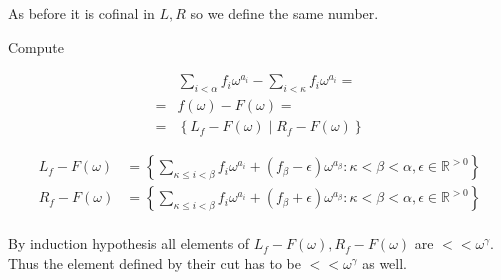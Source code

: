 \documentclass{article}
\newcommand{\curly}[1]{\left\{ #1 \right\}}
\newcommand{\R}{\mathbb{R}}
\newcommand{\w}{\omega}
\begin{document}
As before it is cofinal in $L, R$ so we define the same number.

Compute

\begin{align*}
  &\sum_{i < \alpha} f_i \w^{a_i} - \sum_{i < \kappa} f_i \w^{a_i} = \\
	= &f(\w) - F(\w) = \\
	= &\curly{L_f - F(\w) \mid R_f - F(\w)}
\end{align*}

\begin{align*}
  L_f - F(\w) &= \curly{\sum_{\kappa \leq i < \beta} f_i \w^{a_i} + (f_\beta - \epsilon) \w^{a_\beta}
	\colon \kappa < \beta < \alpha, \epsilon \in \R^{>0}} \\
  R_f - F(\w) &= \curly{\sum_{\kappa \leq i < \beta} f_i \w^{a_i} + (f_\beta + \epsilon) \w^{a_\beta}
	\colon \kappa < \beta < \alpha, \epsilon \in \R^{>0}} \\
\end{align*}

By induction hypothesis all elements of $L_f - F(\w), R_f - F(\w)$ are $<< \w^\gamma$. Thus the element defined by their cut has to be $<< \w^\gamma$ as well.
\end{document}
